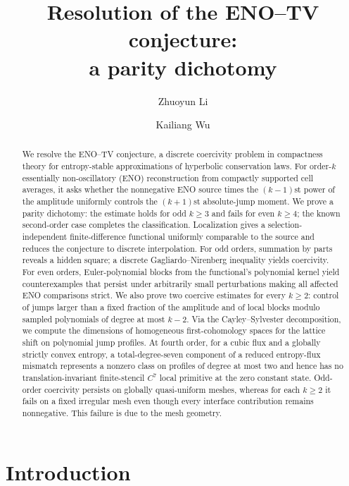 \documentclass[11pt]{amsart}
\title[Resolution of the ENO--TV conjecture]{Resolution of the ENO--TV conjecture:\\ a parity dichotomy}
\author[Z. Li]{Zhuoyun Li}
\author[K. Wu]{Kailiang Wu}
\date{}
\theoremstyle{plain}
\theoremstyle{definition}
\theoremstyle{remark}
\numberwithin{equation}{section}
\theoremstyle{plain}
\begin{document}
	
	
\begin{abstract}
	We resolve the ENO--TV conjecture, a discrete
	coercivity problem in compactness theory for entropy-stable
	approximations of hyperbolic conservation laws.  For order-$k$
	essentially non-oscillatory (ENO) reconstruction from compactly
	supported cell averages, it asks whether the nonnegative ENO source
	times the $(k-1)$st power of the amplitude uniformly controls the
	$(k+1)$st absolute-jump moment.  We prove a parity dichotomy: the
	estimate holds for odd $k\ge3$ and fails for even $k\ge4$; the known
	second-order case completes the classification.  Localization gives
	a selection-independent finite-difference functional uniformly
	comparable to the source and reduces the conjecture to discrete
	interpolation.  For odd orders, summation by parts reveals a hidden
	square; a discrete Gagliardo--Nirenberg inequality yields coercivity.
	For even orders, Euler-polynomial blocks from the functional's
	polynomial kernel yield counterexamples that persist under
	arbitrarily small perturbations making all affected ENO comparisons
	strict.  We also prove two coercive estimates for every $k\ge2$:
	control of jumps larger than a fixed fraction of the amplitude and of
	local blocks modulo sampled polynomials of degree at most $k-2$.
	Via the Cayley--Sylvester decomposition, we compute the dimensions of
	homogeneous first-cohomology spaces for the lattice shift on
	polynomial jump profiles.  At fourth order, for a cubic flux and a
	globally strictly convex entropy, a total-degree-seven component of a
	reduced entropy-flux mismatch represents a nonzero class on profiles
	of degree at most two and hence has no translation-invariant
	finite-stencil $C^7$ local primitive at the zero constant state.
	Odd-order coercivity persists on globally quasi-uniform meshes, whereas for
	each $k\ge2$ it fails on a fixed irregular mesh even though every interface
	contribution remains nonnegative.  This failure is due to the mesh geometry.
\end{abstract}


\maketitle


\tableofcontents

\section{Introduction}\label{sec:intro}
\end{document}
